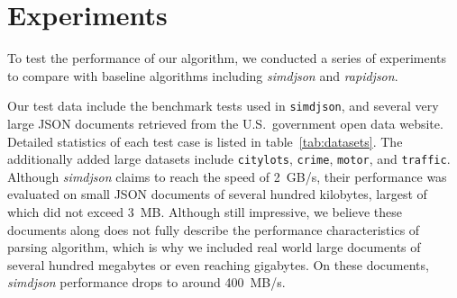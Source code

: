 \documentclass[11pt]{article}
\begin{document}
\section{Experiments}

To test the performance of our algorithm, we conducted a series of experiments to compare with baseline algorithms including \textit{simdjson} and \textit{rapidjson}.

Our test data include the benchmark tests used in \texttt{simdjson}, and several very large JSON documents retrieved from the U.S.\ government open data website. Detailed statistics of each test case is listed in table~\ref{tab:datasets}. The additionally added large datasets include \texttt{citylots}, \texttt{crime}, \texttt{motor}, and \texttt{traffic}. Although \textit{simdjson} claims to reach the speed of \SI{2}{GB/s}, their performance was evaluated on small JSON documents of several hundred kilobytes, largest of which did not exceed \SI{3}{MB}. Although still impressive, we believe these documents along does not fully describe the performance characteristics of parsing algorithm, which is why we included real world large documents of several hundred megabytes or even reaching gigabytes. On these documents, \textit{simdjson} performance drops to around \SI{400}{MB/s}.
\end{document}
